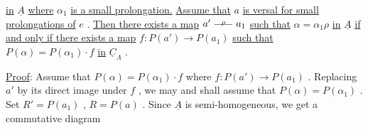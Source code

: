 \begin{center}
\end{center}
\underline{in}  $\underline{A}$  \underline{where}  $\alpha_1$  \underline{is a small prolongation.} \underline{Assume that}  $a$  \underline{is versal for small} \underline{prolongations of}  $e$  . \underline{Then there exists a map}  $a' \overset{\ \rho\ }{\relbar\joinrel\relbar\joinrel\relbar} a_1$  \underline{such that}  $\alpha = \alpha_1 \rho$ \underline{in}  $\underline{A}$  \underline{if and only if there exists a map}  $f : P(a') \rightarrow P(a_1)$  \underline{such that} $P(\alpha) = P(\alpha_1)\cdot f$  \underline{in}  $\underline{C}_{\Lambda}$  .

\underline{Proof}:  Assume that  $P(\alpha) = P(\alpha_1)\cdot f$  where  $f : P(a') \rightarrow P(a_1)$  . Replacing  $a'$ by its direct image under  $f$  , we may and shall assume that  $P(\alpha) = P(\alpha_1)$  . Set  $R' = P(a_1)$  ,  $R = P(a)$  . Since  $\underline{A}$  is semi-homogeneous, we get a commutative diagram

